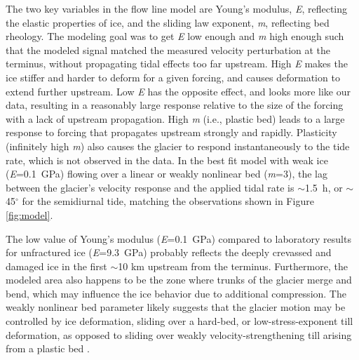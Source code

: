 The two key variables  in the flow line model are Young’s modulus, \textit{E}, reflecting the elastic properties of ice, and the sliding law exponent, \textit{m}, reflecting bed rheology. The modeling goal was to get \textit{E} low enough and \textit{m} high enough such that the modeled signal matched the measured velocity perturbation at the terminus, without propagating tidal effects too far upstream. High \textit{E} makes the ice stiffer and harder to deform for a given forcing, and causes deformation to extend further upstream. Low \textit{E} has the opposite effect, and looks more like our data, resulting in a reasonably large response relative to the size of the forcing with a lack of upstream propagation. High \textit{m} (i.e., plastic bed) leads to a large response to forcing that propagates upstream strongly and rapidly. Plasticity (infinitely high \textit{m}) also causes the glacier to respond instantaneously to the tide rate, which is not observed in the data. In the best fit model with weak ice (\textit{E}=0.1~GPa) flowing over a linear or weakly nonlinear bed (\textit{m}=3), the lag between the glacier's velocity response and the applied tidal rate is $\sim$1.5~h, or $\sim$45$^{\circ}$ for the semidiurnal tide, matching the observations shown in Figure \ref{fig:model}. 


The low value of Young’s modulus (\textit{E}=0.1~GPa) compared to laboratory results for unfractured ice (\textit{E}=9.3~GPa) \citep{reeh2003tidal}
probably reflects the deeply crevassed and damaged ice in the first $\sim$10 km upstream from the terminus. Furthermore, the modeled area also happens to be the zone where trunks of the glacier merge and bend, which may influence the ice behavior due to additional compression. The weakly nonlinear bed parameter likely suggests that the glacier motion may be controlled by ice deformation, sliding over a hard-bed, or low-stress-exponent till deformation, as opposed to sliding over weakly velocity-strengthening till arising from a plastic bed \citep{licciardi1998deglaciation,walker2012viscoelastic}. 



